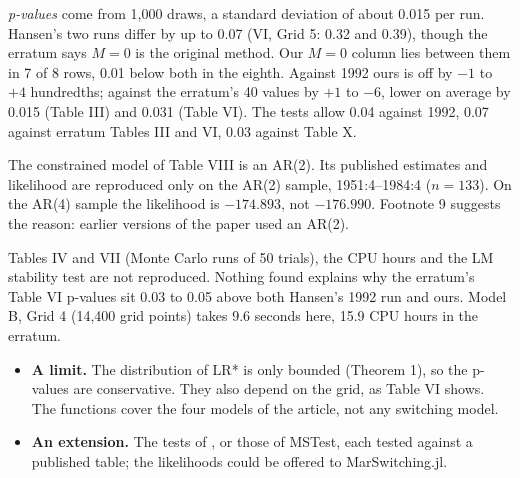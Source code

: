 \emph{p-values} come from 1,000 draws, a standard deviation of about 0.015 per run. Hansen's two runs differ by up to 0.07 (VI, Grid 5: 0.32 and 0.39), though the erratum says $M=0$ is the original method. Our $M=0$ column lies between them in 7 of 8 rows, 0.01 below both in the eighth. Against 1992 ours is off by $-1$ to $+4$ hundredths; against the erratum's 40 values by $+1$ to $-6$, lower on average by 0.015 (Table III) and 0.031 (Table VI). The tests allow 0.04 against 1992, 0.07 against erratum Tables III and VI, 0.03 against Table X.

The constrained model of Table VIII is an AR(2). Its published estimates and likelihood are reproduced only on the AR(2) sample, 1951:4--1984:4 ($n=133$). On the AR(4) sample the likelihood is $-174.893$, not $-176.990$. Footnote 9 suggests the reason: earlier versions of the paper used an AR(2).

Tables IV and VII (Monte Carlo runs of 50 trials), the CPU hours and the LM stability test are not reproduced. Nothing found explains why the erratum's Table VI p-values sit 0.03 to 0.05 above both Hansen's 1992 run and ours. Model B, Grid 4 (14,400 grid points) takes 9.6 seconds here, 15.9 CPU hours in the erratum.

\begin{itemize}
  \item \textbf{A limit.} The distribution of LR* is only bounded (Theorem 1), so the p-values are conservative. They also depend on the grid, as Table VI shows. The functions cover the four models of the article, not any switching model.
  \item \textbf{An extension.} The tests of , or those of MSTest, each tested against a published table; the likelihoods could be offered to MarSwitching.jl.
\end{itemize}

{\footnotesize\sloppy
{}
}

\nmcredit

